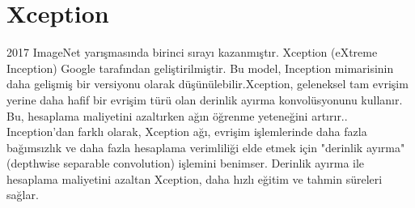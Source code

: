 \section{Xception}
2017 ImageNet yarışmasında birinci sırayı kazanmıştır. Xception (eXtreme Inception) Google tarafından geliştirilmiştir. Bu model, Inception mimarisinin daha gelişmiş bir versiyonu olarak düşünülebilir.Xception, geleneksel tam evrişim yerine daha hafif bir evrişim türü olan derinlik ayırma konvolüsyonunu kullanır. Bu, hesaplama maliyetini azaltırken ağın öğrenme yeteneğini artırır.. Inception'dan farklı olarak, Xception ağı, evrişim işlemlerinde daha fazla bağımsızlık ve daha fazla hesaplama verimliliği elde etmek için "derinlik ayırma" (depthwise separable convolution) işlemini benimser. Derinlik ayırma ile hesaplama maliyetini azaltan Xception, daha hızlı eğitim ve tahmin süreleri sağlar.

\newpage